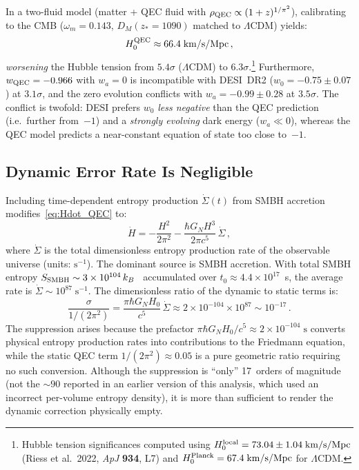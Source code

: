 \documentclass[12pt,a4paper]{article}
\theoremstyle{remark}
\begin{document}
In a two-fluid model (matter + QEC fluid with $\rho_{\rm QEC}\propto (1+z)^{1/\pi^2}$), calibrating to the CMB ($\omega_m = 0.143$, $D_M(z_*=1090)$ matched to $\Lambda$CDM) yields:
\begin{equation}
H_0^{\rm QEC} \approx 66.4\;\mathrm{km/s/Mpc}\,,
\end{equation}
\emph{worsening} the Hubble tension from $5.4\sigma$ ($\Lambda$CDM) to $6.3\sigma$.\footnote{Hubble tension significances computed using $H_0^{\rm local} = 73.04\pm 1.04\;\mathrm{km/s/Mpc}$ (Riess et al.\ 2022, \emph{ApJ} \textbf{934}, L7) and $H_0^{\rm Planck} = 67.4\;\mathrm{km/s/Mpc}$ for $\Lambda$CDM.}
Furthermore, $w_{\rm QEC} = -0.966$ with $w_a = 0$ is incompatible with DESI~DR2 ($w_0 = -0.75\pm 0.07$) at $3.1\sigma$, and the zero evolution conflicts with $w_a = -0.99\pm 0.28$ at $3.5\sigma$.
The conflict is twofold: DESI prefers $w_0$ \emph{less negative} than the QEC prediction (i.e.\ further from~$-1$) and a \emph{strongly evolving} dark energy ($w_a \ll 0$), whereas the QEC model predicts a near-constant equation of state too close to~$-1$.

\subsection{Dynamic Error Rate Is Negligible}

Including time-dependent entropy production $\dot\Sigma(t)$ from SMBH accretion modifies~\eqref{eq:Hdot_QEC} to:
\begin{equation}
\dot H = -\frac{H^2}{2\pi^2} - \frac{\hbar G_N H^3}{2\pi c^5}\,\dot\Sigma\,,
\end{equation}
where $\dot\Sigma$ is the total dimensionless entropy production rate of the observable universe (units: $\mathrm{s}^{-1}$).
The dominant source is SMBH accretion.
With total SMBH entropy $S_{\rm SMBH} \sim 3\times 10^{104}\,k_B$~\cite{EganLineweaver2010} accumulated over $t_0 \approx 4.4\times 10^{17}$~s, the average rate is $\dot\Sigma \sim 10^{87}\;\mathrm{s^{-1}}$.
The dimensionless ratio of the dynamic to static terms is:
\begin{equation}
\frac{\sigma}{1/(2\pi^2)} = \frac{\pi\hbar G_N H_0}{c^5}\,\dot\Sigma \approx 2\times 10^{-104}\times 10^{87} \sim 10^{-17}\,.
\end{equation}
The suppression arises because the prefactor $\pi\hbar G_N H_0/c^5 \approx 2\times 10^{-104}\;\mathrm{s}$ converts physical entropy production rates into contributions to the Friedmann equation, while the static QEC term $1/(2\pi^2) \approx 0.05$ is a pure geometric ratio requiring no such conversion.
Although the suppression is ``only'' 17~orders of magnitude (not the ${\sim}90$ reported in an earlier version of this analysis, which used an incorrect per-volume entropy density), it is more than sufficient to render the dynamic correction physically empty.
\end{document}
